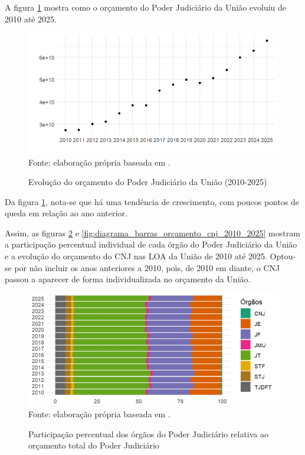 A figura \ref{fig:diagrama_linha_orçamento_justiça_2010_2025} mostra como o orçamento do Poder Judiciário da União evoluiu de 2010 até 2025.

\begin{figure}[H]
	\centering
	\caption{Evolução do orçamento do Poder Judiciário da União (2010-2025)}
	\includegraphics[width=1\linewidth]{figuras/diagrama_linha_orçamento_justiça_2010_2025}
	\label{fig:diagrama_linha_orçamento_justiça_2010_2025}
	\footnotesize{Fonte: elaboração própria baseada em \cite{}.}
\end{figure}

Da figura \ref{fig:diagrama_linha_orçamento_justiça_2010_2025}, nota-se que há uma tendência de crescimento, com poucos pontos de queda em relação ao ano anterior.

Assim, as figuras \ref{fig:diagrama_barras_orçamento_orgaos_justiça_2010_2025} e \ref{fig:diagrama_barras_orçamento_cnj_2010_2025} mostram a participação percentual individual de cada órgão do Poder Judiciário da União e a evolução do orçamento do CNJ nas LOA da União de 2010 até 2025. Optou-se por não incluir os anos anteriores a 2010, pois, de 2010 em diante, o CNJ passou a aparecer de forma individualizada no orçamento da União.

\begin{figure}[H]
	\centering
	\caption{Participação percentual dos órgãos do Poder Judiciário relativa ao orçamento total do Poder Judiciário} 
	\includegraphics[width=1\linewidth]{figuras/diagrama_barras_orçamento_orgaos_justiça_2010_2025}
	\label{fig:diagrama_barras_orçamento_orgaos_justiça_2010_2025}
	\footnotesize{Fonte: elaboração própria baseada em \cite{}.}
\end{figure}

